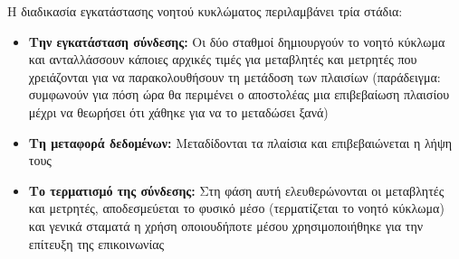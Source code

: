 \begin{itemize}
Η διαδικασία εγκατάστασης νοητού κυκλώματος περιλαμβάνει τρία στάδια:
\begin{itemize}
\item \textbf{Την εγκατάσταση σύνδεσης:} Οι δύο σταθμοί δημιουργούν το νοητό κύκλωμα και ανταλλάσσουν κάποιες αρχικές τιμές για μεταβλητές και μετρητές που χρειάζονται για να παρακολουθήσουν τη μετάδοση των πλαισίων (παράδειγμα: συμφωνούν για πόση ώρα θα περιμένει ο αποστολέας μια επιβεβαίωση πλαισίου μέχρι να θεωρήσει ότι χάθηκε για να το μεταδώσει ξανά)
\item \textbf{Τη μεταφορά δεδομένων:} Μεταδίδονται τα πλαίσια και επιβεβαιώνεται η λήψη τους
\item \textbf{Το τερματισμό της σύνδεσης:} Στη φάση αυτή ελευθερώνονται οι μεταβλητές και μετρητές, αποδεσμεύεται το φυσικό μέσο (τερματίζεται το νοητό κύκλωμα) και γενικά σταματά η χρήση οποιουδήποτε μέσου χρησιμοποιήθηκε για την επίτευξη της επικοινωνίας
\end{itemize}
\end{itemize}